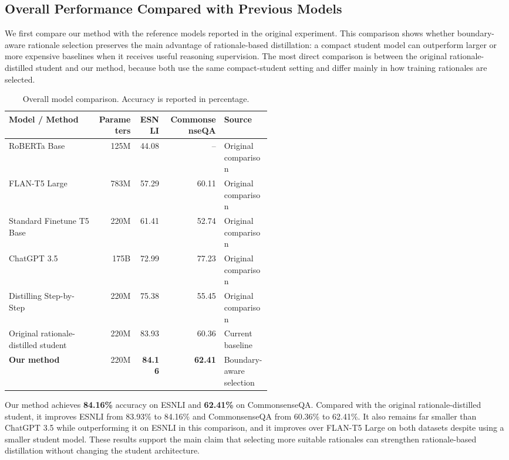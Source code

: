\subsection{Overall Performance Compared with Previous Models}
\label{sec:overall-performance}

We first compare our method with the reference models reported in the original experiment. This comparison shows whether boundary-aware rationale selection preserves the main advantage of rationale-based distillation: a compact student model can outperform larger or more expensive baselines when it receives useful reasoning supervision. The most direct comparison is between the original rationale-distilled student and our method, because both use the same compact-student setting and differ mainly in how training rationales are selected.

\begin{table}[H]
\centering
\caption{Overall model comparison. Accuracy is reported in percentage.}
\label{tab:overall-performance}
\begin{tabular}{p{0.34\linewidth} r r r p{0.18\linewidth}}
\hline
Model / Method & Parameters & ESNLI & CommonsenseQA & Source \\
\hline
RoBERTa Base & 125M & 44.08 & -- & Original comparison \\
FLAN-T5 Large & 783M & 57.29 & 60.11 & Original comparison \\
Standard Finetune T5 Base & 220M & 61.41 & 52.74 & Original comparison \\
ChatGPT 3.5 & 175B & 72.99 & 77.23 & Original comparison \\
Distilling Step-by-Step & 220M & 75.38 & 55.45 & Original comparison \\
Original rationale-distilled student & 220M & 83.93 & 60.36 & Current baseline \\
\textbf{Our method} & 220M & \textbf{84.16} & \textbf{62.41} & Boundary-aware selection \\
\hline
\end{tabular}
\end{table}

Our method achieves \textbf{84.16\%} accuracy on ESNLI and \textbf{62.41\%} on CommonsenseQA. Compared with the original rationale-distilled student, it improves ESNLI from 83.93\% to 84.16\% and CommonsenseQA from 60.36\% to 62.41\%. It also remains far smaller than ChatGPT 3.5 while outperforming it on ESNLI in this comparison, and it improves over FLAN-T5 Large on both datasets despite using a smaller student model. These results support the main claim that selecting more suitable rationales can strengthen rationale-based distillation without changing the student architecture.

